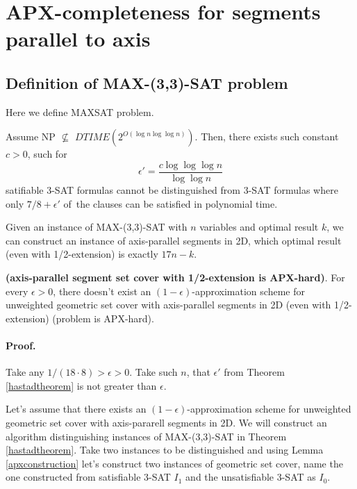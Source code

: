 \section{APX-completeness for segments parallel to axis}
\label{section:segment_apx}

\subsection{Definition of  MAX-(3,3)-SAT problem}
Here we define MAXSAT problem.

\begin{tw}{
	\label{hastadtheorem}
	\textbf{\cite{hastad}}
	Assume NP $\not\subseteq$ $DTIME(2^{O(\log n \log \log n)})$.
	Then, there exists such constant $c > 0$, such for
	$$\epsilon' = \frac{c \log \log \log n}{\log \log n}$$ 
	satifiable 3-SAT formulas cannot be distinguished from
	3-SAT formulas where only $7/8+\epsilon'$ of~the clauses
	can be satisfied in polynomial time.
}\end{tw}

\begin{lemma}{
	\label{apxconstruction}
	Given an instance of  MAX-(3,3)-SAT 
	with $n$ variables and optimal result $k$,
	we can construct an instance of axis-parallel segments in 2D,
	which optimal result (even with 1/2-extension) is exactly $17n - k$.
}\end{lemma}

\begin{tw}{
	\textbf{(axis-parallel segment set cover with 1/2-extension is APX-hard)}.	
	For every $\epsilon > 0$,
	there doesn't exist an $(1-\epsilon)$-approximation scheme
	for unweighted geometric set cover
	with axis-parallel segments in 2D (even with 1/2-extension)
	(problem is APX-hard).
}\end{tw}

\paragraph{Proof.}
Take any $1/(18 \cdot 8) > \epsilon > 0$.
Take such $n$, that $\epsilon'$ from Theorem \ref{hastadtheorem}
is not greater than $\epsilon$.

Let's assume that there exists an $(1-\epsilon)$-approximation scheme
for unweighted geometric set cover with axis-pararell segments in 2D.
We will construct an algorithm distinguishing instances of MAX-(3,3)-SAT
in Theorem \ref{hastadtheorem}.
Take two instances to be distinguished and using
Lemma \ref{apxconstruction}
let's construct two instances of geometric set cover,
name the one constructed from satisfiable 3-SAT $I_1$
and the unsatisfiable 3-SAT as $I_0$.

